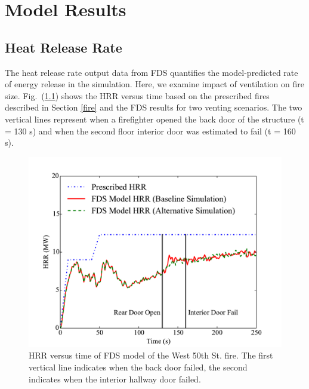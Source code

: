 \documentclass[11pt,oneside]{book}
\begin{document}
\chapter{Model Results}
\label{results}

\section{Heat Release Rate}
\label{HRR}
The heat release rate output data from FDS quantifies the model-predicted rate of energy release in the simulation. Here, we examine impact of ventilation on fire size. Fig.~(\ref{fig:hrr}) shows the HRR versus time based on the prescribed fires described in Section \ref{fire} and the FDS results for two venting scenarios. The two vertical lines represent when a firefighter opened the back door of the structure (t = 130 s) and when the second floor interior door was estimated to fail (t = 160 s).

\begin{figure}[h!]
\centering
\includegraphics[width=.80\textwidth]{../Figures/Chicago_Fire_HRR}
\caption{HRR versus time of FDS model of the West 50th St. fire. The first vertical line indicates when the back door failed, the second indicates when the interior hallway door failed.}
\label{fig:hrr}
\end{figure}
\end{document}
